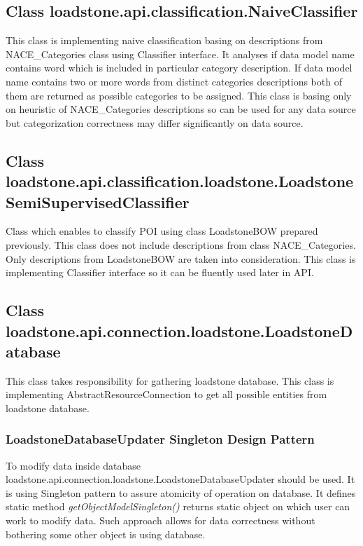 \subsection{Class \newline loadstone.api.classification.NaiveClassifier}
\label{naive_classifier}
This class is implementing naive classification basing on descriptions from NACE\_Categories class using Classifier interface. It analyses if data model name contains word which is included in particular category description. If data model name contains two or more words from distinct categories descriptions both of them are returned as possible categories to be assigned. This class is basing only on heuristic of NACE\_Categories descriptions so can be used for any data source but categorization correctness may differ significantly on data source.

\subsection{Class \newline loadstone.api.classification.loadstone.\newline LoadstoneSemiSupervisedClassifier}
Class which enables to classify POI using class LoadstoneBOW prepared previously. This class does not include descriptions from class NACE\_Categories. Only descriptions from LoadstoneBOW are taken into consideration. This class is implementing Classifier interface so it can be fluently used later in API.

\subsection{Class \newline loadstone.api.connection.loadstone.LoadstoneDatabase}
This class takes responsibility for gathering loadstone database. This class is implementing AbstractResourceConnection to get all possible entities from loadstone database. 

\subsubsection{LoadstoneDatabaseUpdater Singleton Design Pattern}
To modify data inside database loadstone.api.connection.loadstone.LoadstoneDatabaseUpdater should be used. It is using Singleton pattern to assure atomicity of operation on database. It defines static method \textit{getObjectModelSingleton()} returns static object on which user can work to modify data. Such approach allows for data correctness without bothering some other object is using database.  

